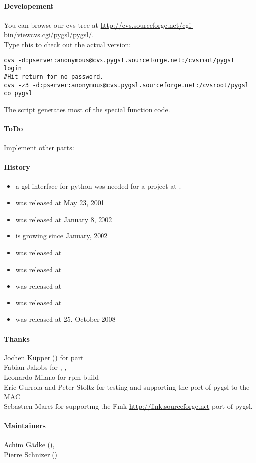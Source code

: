 \paragraph*{Developement}
You can browse our cvs tree at
\url{http://cvs.sourceforge.net/cgi-bin/viewcvs.cgi/pygsl/pygsl/}.
\\
Type this to check out the actual version:
\begin{verbatim}
cvs -d:pserver:anonymous@cvs.pygsl.sourceforge.net:/cvsroot/pygsl login
#Hit return for no password.
cvs -z3 -d:pserver:anonymous@cvs.pygsl.sourceforge.net:/cvsroot/pygsl co pygsl
\end{verbatim}
The script  generates most of the special 
function code.

%
\paragraph*{ToDo}
Implement other parts:


\paragraph*{History}
\begin{itemize}
\item a gsl-interface for python was needed for a project at
.
\item {} was released at May 23, 2001
\item {} was released at January 8, 2002
\item {} is growing since January, 2002
\item {} was released at 
\item {} was released at 
\item {} was released at 
\item {} was released at 
\item {} was released at 25. October 2008
\end{itemize}

\paragraph*{Thanks}
Jochen K\"upper () for 
 part\\
Fabian Jakobs for , 
, \\ 
Leonardo Milano for rpm build\\
Eric Gurrola and  Peter Stoltz for testing and supporting the port of pygsl to
the MAC\\
Sebastien Maret for supporting the Fink \url{http://fink.sourceforge.net}
port of pygsl.


\paragraph*{Maintainers}
Achim G\"adke (),\\
Pierre Schnizer ()
